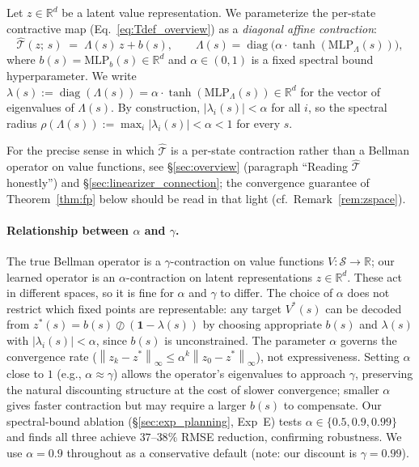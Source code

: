 \documentclass{article}
\newcommand{\R}{\mathbb{R}}
\newcommand{\cT}{\hat{\mathcal{T}}}          %
\newcommand{\spb}{\alpha}                    %
\newcommand{\eigs}{\lambda}                  %
\newcommand{\norm}[1]{\left\|#1\right\|}
\begin{document}
Let $z \in \R^d$ be a latent value representation.
We parameterize the per-state contractive map (Eq.~\eqref{eq:Tdef_overview})
as a \emph{diagonal affine contraction}:
\begin{equation}
  \cT(z;\, s) \;=\; \Lambda(s)\, z + b(s),
  \qquad
  \Lambda(s) = \operatorname{diag}\!\bigl(\spb \cdot \tanh(\mathrm{MLP}_\Lambda(s))\bigr),
  \label{eq:operator}
\end{equation}
where $b(s) = \mathrm{MLP}_b(s) \in \R^d$ and $\spb \in (0,1)$ is a fixed spectral
bound hyperparameter.
We write $\eigs(s) := \operatorname{diag}(\Lambda(s)) = \spb \cdot \tanh(\mathrm{MLP}_\Lambda(s)) \in \R^d$
for the vector of eigenvalues of $\Lambda(s)$.
By construction, $|\eigs_i(s)| < \spb$ for all $i$, so the spectral radius
$\rho(\Lambda(s)) := \max_i |\eigs_i(s)| < \spb < 1$ for every $s$.

For the precise sense in which $\cT$ is a per-state contraction rather than a
Bellman operator on value functions, see \S\ref{sec:overview} (paragraph
``Reading $\cT$ honestly'') and \S\ref{sec:linearizer_connection}; the
convergence guarantee of Theorem~\ref{thm:fp} below should be read in that
light (cf.\ Remark~\ref{rem:zspace}).

\paragraph{Relationship between $\spb$ and $\gamma$.}
The true Bellman operator is a $\gamma$-contraction on value functions
$V: \mathcal{S} \to \R$; our learned operator is an $\spb$-contraction on latent
representations $z \in \R^d$.
These act in different spaces, so it is fine for $\spb$ and $\gamma$ to
differ.
The choice of $\spb$ does not restrict which fixed points are representable:
any target $V^*(s)$ can be decoded from
$z^*(s) = b(s) \oslash (\mathbf{1} - \eigs(s))$ by choosing appropriate
$b(s)$ and $\eigs(s)$ with $|\eigs_i(s)| < \spb$, since $b(s)$ is unconstrained.
The parameter $\spb$ governs the convergence rate
($\norm{z_k - z^*}_\infty \leq \spb^k \norm{z_0 - z^*}_\infty$), not
expressiveness.
Setting $\spb$ close to $1$ (e.g., $\spb \approx \gamma$) allows the operator's
eigenvalues to approach $\gamma$, preserving the natural discounting structure at
the cost of slower convergence; smaller $\spb$ gives faster contraction but may
require a larger $b(s)$ to compensate.
Our spectral-bound ablation (\S\ref{sec:exp_planning}, Exp~E) tests
$\spb \in \{0.5, 0.9, 0.99\}$ and finds all three achieve
$37\text{--}38\%$ RMSE reduction, confirming robustness.
We use $\spb = 0.9$ throughout as a conservative default
(note: our discount is $\gamma = 0.99$).
\end{document}
